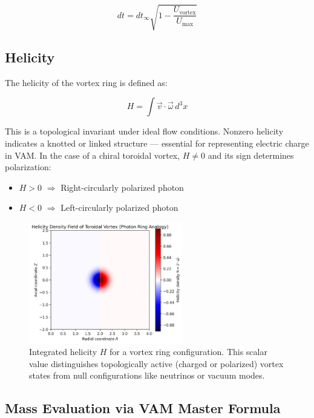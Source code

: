 \begin{equation}
dt = dt_{\infty} \sqrt{1 - \frac{U_{\text{vortex}}}{U_{\text{max}}}}
\end{equation}

\subsection{Helicity}

The helicity of the vortex ring is defined as:

\begin{equation}
H = \int \vec{v} \cdot \vec{\omega} \, d^3x
\end{equation}

This is a topological invariant under ideal flow conditions. Nonzero helicity indicates a knotted or linked structure — essential for representing electric charge in VAM. In the case of a chiral toroidal vortex, $H \neq 0$ and its sign determines polarization:

\begin{itemize}
    \item $H > 0$ \quad $\Rightarrow$ Right-circularly polarized photon
    \item $H < 0$ \quad $\Rightarrow$ Left-circularly polarized photon
\end{itemize}

\begin{figure}[H]
    \centering
    \includegraphics[width=0.6\textwidth]{images/helicity_ring_integration.png}
    \caption{Integrated helicity $H$ for a vortex ring configuration. This scalar value distinguishes topologically active (charged or polarized) vortex states from null configurations like neutrinos or vacuum modes.}
\end{figure}

\subsection{Mass Evaluation via VAM Master Formula}

